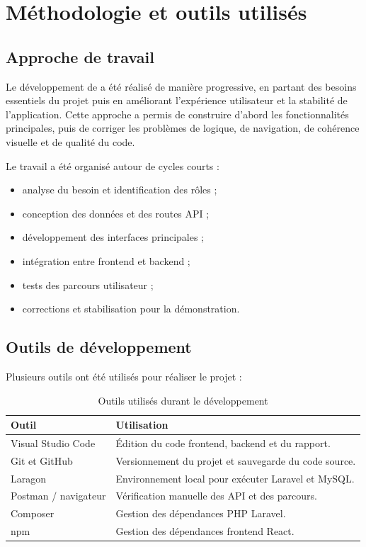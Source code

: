 \chapter{Méthodologie et outils utilisés}

\section{Approche de travail}

\noindent
Le développement de \projectName{} a été réalisé de manière progressive, en partant des besoins essentiels du projet puis en améliorant l'expérience utilisateur et la stabilité de l'application. Cette approche a permis de construire d'abord les fonctionnalités principales, puis de corriger les problèmes de logique, de navigation, de cohérence visuelle et de qualité du code.

\noindent
Le travail a été organisé autour de cycles courts :

\begin{itemize}
    \item analyse du besoin et identification des rôles ;
    \item conception des données et des routes API ;
    \item développement des interfaces principales ;
    \item intégration entre frontend et backend ;
    \item tests des parcours utilisateur ;
    \item corrections et stabilisation pour la démonstration.
\end{itemize}

\section{Outils de développement}

\noindent
Plusieurs outils ont été utilisés pour réaliser le projet :

\begin{table}[h!]
\centering
\renewcommand{\arraystretch}{1.4}
\begin{tabular}{|p{4cm}|p{9cm}|}
\hline
\textbf{Outil} & \textbf{Utilisation} \\
\hline
Visual Studio Code & Édition du code frontend, backend et du rapport. \\
\hline
Git et GitHub & Versionnement du projet et sauvegarde du code source. \\
\hline
Laragon & Environnement local pour exécuter Laravel et MySQL. \\
\hline
Postman / navigateur & Vérification manuelle des API et des parcours. \\
\hline
Composer & Gestion des dépendances PHP Laravel. \\
\hline
npm & Gestion des dépendances frontend React. \\
\hline
\end{tabular}
\caption{Outils utilisés durant le développement}
\label{tab:outils_dev}
\end{table}

